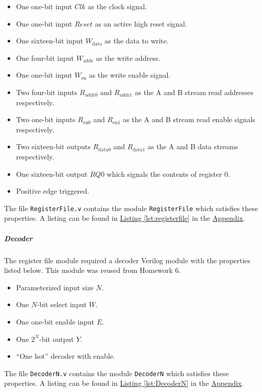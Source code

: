 \begin{itemize}
    \item One one-bit input $Clk$ as the clock signal.
    \item One one-bit input $Reset$ as an active high reset signal.
    \item One sixteen-bit input $W_\text{data}$ as the data to write.
    \item One four-bit input $W_\text{addr}$ as the write address.
    \item One one-bit input $W_\text{en}$ as the write enable signal.
    \item Two four-bit inputs $R_\text{addr0}$ and $R_\text{addr1}$ as the A and B stream read addresses respectively.
    \item Two one-bit inputs $R_\text{en0}$ and $R_\text{en1}$ as the A and B stream read enable signals respectively.
    \item Two sixteen-bit outputs $R_\text{data0}$ and $R_\text{data1}$ as the A and B data streams respectively.
    \item One sixteen-bit output $RQ0$ which signals the contents of register 0.
    \item Positive edge triggered.
\end{itemize}

The file \verb|RegisterFile.v| contains the module \verb|RegisterFile| which satisfies these properties.
A listing can be found in \hyperref[lst:registerfile]{Listing \ref*{lst:registerfile}} in the \hyperref[sec:appendix]{Appendix}.

\subparagraph{Decoder} \label{subpar:decoder}

The register file module required a decoder Verilog module with the properties listed below.
This module was reused from Homework 6.

\begin{itemize}
    \item Parameterized input size $N$.
    \item One $N$-bit select input $W$.
    \item One one-bit enable input $E$.
    \item One $2^N$-bit output $Y$.
    \item ``One hot'' decoder with enable.
\end{itemize}

The file \verb|DecoderN.v| contains the module \verb|DecoderN| which satisfies these properties.
A listing can be found in \hyperref[lst:DecoderN]{Listing \ref*{lst:DecoderN}} in the \hyperref[sec:appendix]{Appendix}.

